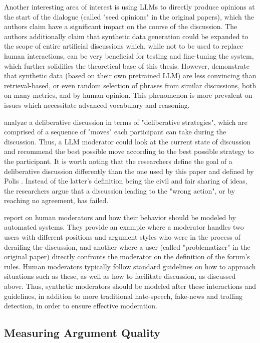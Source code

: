 Another interesting area of interest is using LLMs to directly produce opinions at the start of the dialogue (called "seed opinions" in the original papers), which the authors claim have a significant impact on the course of the discussion. The authors additionally claim that synthetic data generation could be expanded to the scope of entire artificial discussions which, while not to be used to replace human interactions, can be very beneficial for testing and fine-tuning the system, which further solidifies the theoretical base of this thesis. However, \cite{karadzhov2023delidata} demonstrate that synthetic data (based on their own pretrained LLM) are less convincing than retrieval-based, or even random selection of phrases from similar discussions, both on many metrics, and by human opinion. This phenomenon is more prevalent on issues which necessitate advanced vocabulary and reasoning.

\cite{al-khatib-etal-2018-modeling} analyze a deliberative discussion in terms of "deliberative strategies", which are comprised of a sequence of "moves" each participant can take during the discussion. Thus, a LLM moderator could look at the current state of discussion and recommend the best possible move according to the best possible strategy to the participant. It is worth noting that the researchers define the goal of a deliberative discussion differently than the one used by this paper and defined by Polis \cite{small-polis-llm}. Instead of the latter's definition being the civil and fair sharing of ideas, the researchers argue that a discussion leading to the "wrong action", or by reaching no agreement, has failed.

\cite{vecchi-2021-towards} report on human moderators and how their behavior should be modeled by automated systems. They provide an example where a moderator handles two users with different positions and argument styles who were in the process of derailing the discussion, and another where a user (called "problematizer" in the original paper) directly confronts the moderator on the definition of the forum's rules. Human moderators typically follow standard guidelines on how to approach situations such as these, as well as how to facilitate discussion, as discussed above. Thus, synthetic moderators should be modeled after these interactions and guidelines, in addition to more traditional hate-speech, fake-news and trolling detection, in order to ensure effective moderation. 


\subsection{Measuring Argument Quality}
\label{sec:related:measures}

